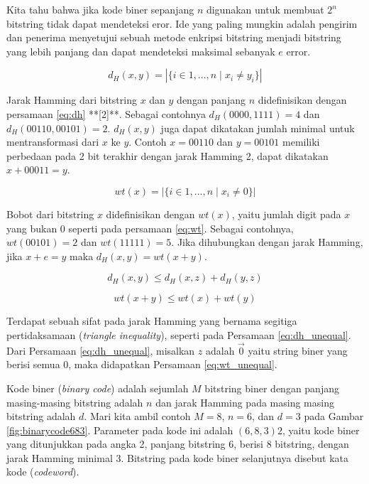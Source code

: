 \documentclass[conference,compsoc]{IEEEtran}
\begin{document}
Kita tahu bahwa jika kode biner sepanjang $n$ digunakan untuk membuat $2^n$ bitstring tidak dapat mendeteksi eror. Ide yang paling mungkin adalah pengirim dan penerima menyetujui sebuah metode enkripsi bitstring menjadi bitstring yang lebih panjang dan dapat mendeteksi maksimal sebanyak $e$ error.

\begin{equation}
d_H(x,y) = |\{i \in {1,...,n} \mid x_i \neq y_i\}|
\label{eq:dh}
\end{equation}

Jarak Hamming dari bitstring $x$ dan $y$ dengan panjang $n$ didefinisikan dengan persamaan \ref{eq:dh} **[2]**. Sebagai contohnya $d_H(0000,1111)= 4$ dan $d_H(00110,00101)= 2$. $d_H(x,y)$ juga dapat dikatakan jumlah minimal untuk mentransformasi dari $x$ ke $y$. Contoh $x=00110$ dan $y=00101$ memiliki perbedaan pada 2 bit terakhir dengan jarak Hamming 2, dapat dikatakan $x+00011 = y$.

\begin{equation}
wt(x) = |\{i \in {1,...,n} \mid x_i \neq 0\}|
\label{eq:wt}
\end{equation}

Bobot dari bitstring $x$ didefinisikan dengan $wt(x)$, yaitu jumlah digit pada $x$ yang bukan $0$ seperti pada persamaan \ref{eq:wt}. Sebagai contohnya, $wt(00101) = 2$ dan $wt(11111) = 5$. Jika dihubungkan dengan jarak Hamming, jika $x+e = y$ maka $d_H(x,y) = wt(x+y)$.

\begin{equation}
d_H(x,y) \le d_H(x,z) + d_H(y,z)
\label{eq:dh_unequal}
\end{equation}

\begin{equation}
wt(x+y) \le wt(x) + wt(y)
\label{eq:wt_unequal}
\end{equation}

Terdapat sebuah sifat pada jarak Hamming yang bernama segitiga pertidaksamaan (\textit{triangle inequality}), seperti pada Persamaan \ref{eq:dh_unequal}. Dari Persamaan \ref{eq:dh_unequal}, misalkan $z$ adalah $\vec{0}$ yaitu string biner yang berisi semua $0$, maka didapatkan Persamaan \ref{eq:wt_unequal}.

Kode biner (\textit{binary code}) adalah sejumlah $M$ bitstring biner dengan panjang masing-masing bitstring adalah $n$ dan jarak Hamming pada masing masing bitstring adalah $d$. Mari kita ambil contoh $M=8$, $n=6$, dan $d=3$ pada Gambar \ref{fig:binarycode683}. Parameter pada kode ini adalah $(6,8,3)2$, yaitu kode biner yang ditunjukkan pada angka 2, panjang bitstring 6, berisi 8 bitstring, dengan jarak Hamming minimal 3. Bitstring pada kode biner selanjutnya disebut kata kode (\textit{codeword}).
\end{document}
